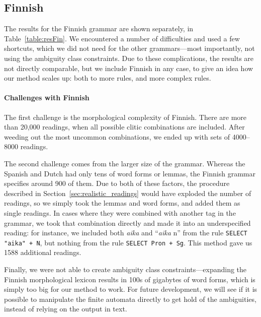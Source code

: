 {{\subsection{Finnish}
\label{sec:finnishEval}

The results for the Finnish grammar are shown separately, in
Table~\ref{table:resFin}. We encountered a number of difficulties and
used a few shortcuts, which we did not need for the other
grammars---most importantly, not using the ambiguity class
constraints. Due to these complications, the results are not directly
comparable, but we include Finnish in any case, to give an idea how
our method scales up: both to more rules, and more complex rules.

\paragraph{Challenges with Finnish} The first challenge is the
morphological complexity of Finnish.  There are more than 20,000
readings, when all possible clitic combinations are included.  After
weeding out the most uncommon combinations, we ended up with sets of
4000--8000 readings.

The second challenge comes from the larger size of the
grammar. Whereas the Spanish and Dutch had only tens of word forms or
lemmas, the Finnish grammar specifies around 900 of them.  Due to both
of these factors, the procedure described in
Section~\ref{sec:realistic_readings} would have exploded the number of
readings, so we simply took the lemmas and word forms, and added them
as single readings.  In cases where they were combined with another
tag in the grammar, we took that combination directly and made it into
an underspecified reading: for instance, we included both \emph{aika}
and ``\emph{aika} n'' from the rule \texttt{SELECT "aika" + N}, but
nothing from the rule \texttt{SELECT Pron + Sg}. This method gave us
1588 additional readings.

Finally, we were not able to create ambiguity class
constraints---expanding the Finnish morphological lexicon results in
100s of gigabytes of word forms, which is simply too big for our
method to work.  For future development, we will see if it is possible
to manipulate the finite automata directly to get hold of the
ambiguities, instead of relying on the output in text.


\def\oneClLG{{\sc 1~cl~+~lem}}
\def\twoClLG{{\sc 2~cl~+~lem}}
\def\oneClRG{{\sc 1~cl~+~rds}}
\def\allRG{{\sc only~rds}}

\def\wH{1.1cm}
\def\wdt{0.7cm}

}}
